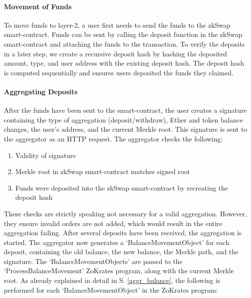 \documentclass[../../thesis.tex]{subfiles}
\begin{document}
\paragraph{Movement of Funds}
To move funds to layer-2, a user first needs to send the funds to the zkSwap smart-contract. Funds can be sent by calling the deposit function in the zkSwap smart-contract and attaching the funds to the transaction. To verify the deposits in a later step, we create a recursive deposit hash by hashing the deposited amount, type, and user address with the existing deposit hash. The deposit hash is computed sequentially and ensures users deposited the funds they claimed.

\paragraph{Aggregating Deposits} \label{aggr_deps}
After the funds have been sent to the smart-contract, the user creates a signature containing the type of aggregation (deposit/withdraw), Ether and token balance changes, the user's address, and the current Merkle root. This signature is sent to the aggregator as an HTTP request. The aggregator checks the following: 

\begin{enumerate}
    \item Validity of signature
    \item Merkle root in zkSwap smart-contract matches signed root
    \item Funds were deposited into the zkSwap smart-contract by recreating the deposit hash
\end{enumerate}

These checks are strictly speaking not necessary for a valid aggregation. However, they ensure invalid orders are not added, which would result in the entire aggregation failing. After several deposits have been received, the aggregation is started. The aggregator now generates a `BalanceMovementObject' for each deposit, containing the old balance, the new balance, the Merkle path, and the signature. The `BalanceMovementObjects' are passed to the `ProcessBalanceMovement' ZoKrates program, along with the current Merkle root. As already explained in detail in S. \ref{aggr_balance}, the following is performed for each `BalanceMovementObject' in the ZoKrates program:
\end{document}
